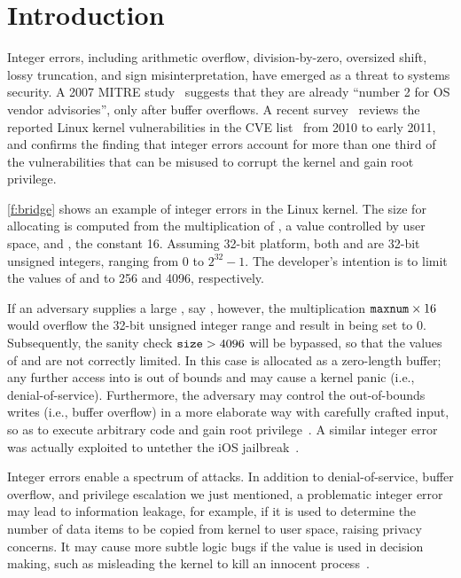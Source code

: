 \section{Introduction}
\label{s:intro}

Integer errors, including arithmetic overflow, division-by-zero,
oversized shift, lossy truncation, and sign misinterpretation, have
emerged as a threat to systems security.  A 2007 MITRE
study~\cite{christey:vuln} suggests that they are already ``number
2 for OS vendor advisories'', only after buffer overflows.  A recent
survey~\cite{chen:kbugs} reviews the reported Linux kernel
vulnerabilities in the CVE list~\cite{cve} from 2010 to early 2011,
and confirms the finding that integer errors account for more than
one third of the vulnerabilities that can be misused to corrupt the
kernel and gain root privilege.

\autoref{f:bridge} shows an example of integer errors in the Linux
kernel.  The size for allocating  is computed from the
multiplication of , a value controlled by user space,
and , the constant 16.  Assuming
32-bit platform, both  and  are 32-bit unsigned
integers, ranging from 0 to $2^{32} - 1$.
The developer's intention is to limit the values of 
 and  to 256 and 4096, respectively.

If an adversary supplies a large , say
, however, the multiplication $\texttt{maxnum} \times 16$ would
overflow the 32-bit unsigned integer range and result in 
being set to 0.  Subsequently, the sanity check $\texttt{size} > 4096$
will be bypassed, so that the values of  and 
are not correctly limited.  In this case  is allocated as
a zero-length buffer; any further access into  is out of
bounds and may cause a kernel panic (i.e., denial-of-service).
Furthermore, the adversary may control the out-of-bounds writes
(i.e., buffer overflow) in a more elaborate way with carefully
crafted input, so as to execute arbitrary code and gain root
privilege~\cite[CVE-2006-5751]{cve}.  A similar integer error was
actually exploited to untether the iOS jailbreak~\cite{esser:ios}.

Integer errors enable a spectrum of attacks.  In addition to
denial-of-service, buffer overflow, and privilege escalation we
just mentioned, a problematic integer error may lead to information
leakage, for example, if it is used to determine the number of data
items to be copied from kernel to user space, raising privacy
concerns.  It may cause more subtle logic bugs if the value is used
in decision making, such as misleading the kernel to kill an innocent
process~\cite[CVE-2011-4097]{cve}.


